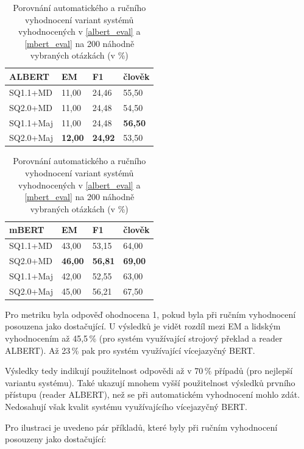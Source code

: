 \begin{table}[H]
\centering
\begin{tabular}{|l||l|l|l|}
    \hline
        {ALBERT}       & \textbf{EM} & \textbf{F1} & \textbf{člověk} \\ \hline\hline
    SQ1.1+MD  & 11,00       & 24,46       & 55,50               \\ \hline
    SQ2.0+MD  & 11,00       & 24,48       & 54,50               \\ \hline
    SQ1.1+Maj & 11,00       & 24,48      & \textbf{56,50}               \\ \hline
    SQ2.0+Maj & \textbf{12,00}       & \textbf{24,92}      & 53,50               \\ \hline
    \end{tabular}
    \begin{tabular}{|l||l|l|l|}
    \hline
    {mBERT}       & \textbf{EM} & \textbf{F1} & \textbf{člověk} \\ \hline\hline
    SQ1.1+MD  & 43,00       & 53,15         & 64,00               \\ \hline
    SQ2.0+MD  & \textbf{46,00}& \textbf{56,81}& \textbf{69,00}              \\ \hline
    SQ1.1+Maj & 42,00       & 52,55           & 63,00               \\ \hline
    SQ2.0+Maj & 45,00       & 56,21           & 67,50               \\ \hline
    \end{tabular}
\caption{Porovnání automatického a ručního vyhodnocení variant systémů vyhodnocených v \ref{albert_eval} a \ref{mbert_eval} na 200 náhodně vybraných otázkách (v \%)}
\label{tab:human_eval}
\end{table}

Pro metriku  byla odpověď ohodnocena 1, pokud byla při ručním vyhodnocení posouzena jako dostačující. U výsledků je vidět rozdíl mezi EM a lidským vyhodnocením až 45,5\,\% (pro systém využívající strojový překlad a reader ALBERT). Až 23\,\% pak pro systém využívající vícejazyčný BERT.\par
Výsledky tedy indikují použitelnost odpovědi až v 70\,\% případů (pro nejlepší variantu systému). Také ukazují mnohem vyšší použitelnost výsledků prvního přístupu (reader ALBERT), než se při automatickém vyhodnocení mohlo zdát. Nedosahují však kvalit systému využívajícího vícejazyčný BERT.\par
Pro ilustraci je uvedeno pár příkladů, které byly při ručním vyhodnocení posouzeny jako dostačující:

